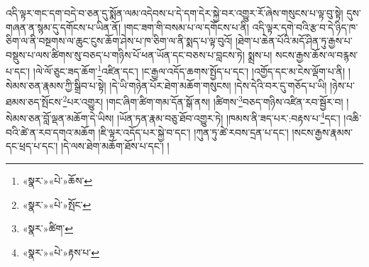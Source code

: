 འདི་ལྟར་གང་དག་བདེ་བ་ཅན་དུ་སྨོན་ལམ་འདེབས་པ་དེ་དག་དེར་སྐྱེ་བར་འགྱུར་རོ་ཞེས་གསུངས་པ་ལྟ་བུ་སྟེ། དུས་གཞན་ན་སྙམ་དུ་དགོངས་པ་ཡིན་ནོ། །གང་ཟག་གི་བསམ་པ་ལ་དགོངས་པ་ནི། འདི་ལྟར་དགེ་བའི་རྩ་བ་དེ་ཉིད་ཁ་ཅིག་ལ་ནི་བསྔགས་ལ་ཆུང་ངུས་ཆོག་ཤེས་པ་ཁ་ཅིག་ལ་ནི་སྨད་པ་ལྟ་བུའོ། །ཐེག་པ་ཆེན་པོའི་མདོ་ཤིན་ཏུ་རྒྱས་པ་བསྡུས་པ་ལས་ཚིགས་སུ་བཅད་པ་གཉིས་པོ་ཕན་ཡོན་དང་བཅས་པ་བླངས་ཏེ། སྨྲས་པ། སངས་རྒྱས་ཆོས་ལ་བརྙས་པ་དང་། །ལེ་ལོ་ཅུང་ཟད་ཆོག་\footnote{«སྣར་»«པེ་»ཆོས་}འཛིན་དང་། །ང་རྒྱལ་འདོད་ཆགས་སྤྱོད་པ་དང་། །འགྱོད་དང་མ་ངེས་ལྡོག་པ་ནི། །སེམས་ཅན་རྣམས་ཀྱི་སྒྲིབ་པ་སྟེ། །དེ་ཡི་གཉེན་པོར་ཐེག་མཆོག་གསུངས། །དེས་དེའི་བར་དུ་གཅོད་པ་ཡི། །ཉེས་པ་ཐམས་ཅད་སྤོངས་\footnote{«སྣར་»«པེ་»སྤོང་}པར་འགྱུར། །གང་ཞིག་ཚིག་གམ་དོན་སྒོ་ནས། །ཚིགས་\footnote{«སྣར་»ཚིག་}བཅད་གཉིས་འཛིན་རབ་སྦྱོར་བ། །སེམས་ཅན་བློ་ལྡན་མཆོག་དེ་ཡིས། །ཡོན་ཏན་རྣམ་བཅུ་ཐོབ་འགྱུར་ཏེ། །ཁམས་ནི་ཟད་པར་:བརྟས་པ་\footnote{«སྣར་»«པེ་»རྟས་པ་}དང་། །འཆི་བའི་ཚེ་ན་རབ་དགའ་མཆོག །ཇི་ལྟར་འདོད་པར་སྐྱེ་བ་དང་། །ཀུན་ཏུ་ཚེ་རབས་དྲན་པ་དང་། །སངས་རྒྱས་རྣམས་དང་ཕྲད་པ་དང་། །དེ་ལས་ཐེག་མཆོག་ཐོས་པ་དང་། །
